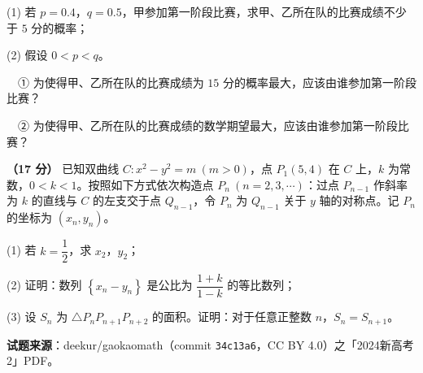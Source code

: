   (1) 若 $p=0.4$，$q=0.5$，甲参加第一阶段比赛，求甲、乙所在队的比赛成绩不少于 $5$ 分的概率；

  (2) 假设 $0<p<q$。

  　① 为使得甲、乙所在队的比赛成绩为 $15$ 分的概率最大，应该由谁参加第一阶段比赛？

  　② 为使得甲、乙所在队的比赛成绩的数学期望最大，应该由谁参加第一阶段比赛？

\textbf{（17 分）} 已知双曲线 $C:x^{2}-y^{2}=m\ (m>0)$，点 $P_1(5,4)$ 在 $C$ 上，$k$ 为常数，$0<k<1$。按照如下方式依次构造点 $P_n\ (n=2,3,\cdots)$：过点 $P_{n-1}$ 作斜率为 $k$ 的直线与 $C$ 的左支交于点 $Q_{n-1}$，令 $P_n$ 为 $Q_{n-1}$ 关于 $y$ 轴的对称点。记 $P_n$ 的坐标为 $\left(x_n,y_n\right)$。

  (1) 若 $k=\dfrac12$，求 $x_2$，$y_2$；

  (2) 证明：数列 $\left\{x_n-y_n\right\}$ 是公比为 $\dfrac{1+k}{1-k}$ 的等比数列；

  (3) 设 $S_n$ 为 $\triangle P_nP_{n+1}P_{n+2}$ 的面积。证明：对于任意正整数 $n$，$S_n=S_{n+1}$。

\par\medskip

\begin{gktip}
\textbf{试题来源}：deekur/gaokaomath（commit \texttt{34c13a6}，CC BY 4.0）之「2024新高考2」PDF。
\end{gktip}
